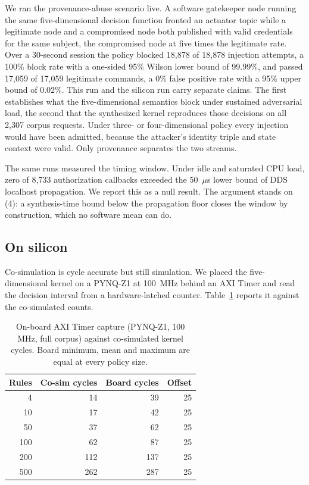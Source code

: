 \documentclass[conference]{IEEEtran}
\newcommand{\new}[1]{\textcolor{hkred}{#1}}
\newcommand{\newcolor}{\color{hkred}}
\begin{document}
We ran the provenance-abuse scenario live. A software gatekeeper node running the same five-dimensional decision function fronted an actuator topic while a legitimate node and a compromised node both published with valid credentials for the same subject, the compromised node at five times the legitimate rate. Over a 30-second session the policy blocked 18{,}878 of 18{,}878 injection attempts, a 100\% block rate with a one-sided 95\% Wilson lower bound of 99.99\%, and passed 17{,}059 of 17{,}059 legitimate commands, a 0\% false positive rate with a 95\% upper bound of 0.02\%. This run and the silicon run carry separate claims. The first establishes what the five-dimensional semantics block under sustained adversarial load, the second that the synthesized kernel reproduces those decisions on all 2{,}307 corpus requests. Under three- or four-dimensional policy every injection would have been admitted, because the attacker's identity triple and state context were valid. Only provenance separates the two streams.

The same runs measured the timing window. Under idle and saturated CPU load, zero of 8{,}733 authorization callbacks exceeded the 50~$\mu$s lower bound of DDS localhost propagation. We report this as a null result. The argument stands on (4): a synthesis-time bound below the propagation floor closes the window by construction, which no software mean can do.

\subsection{\new{On silicon}}
\label{subsec:onsilicon}

\new{Co-simulation is cycle accurate but still simulation. We placed the five-dimensional kernel on a PYNQ-Z1 at 100~MHz behind an AXI Timer and read the decision interval from a hardware-latched counter. Table~\ref{tab:board} reports it against the co-simulated counts.}

\begin{table}[t]
\caption{\new{On-board AXI Timer capture (PYNQ-Z1, 100 MHz, full corpus) against co-simulated kernel cycles. Board minimum, mean and maximum are equal at every policy size.}}
\label{tab:board}
\centering
\newcolor
\begin{tabular}{rrrr}
\toprule
Rules & Co-sim cycles & Board cycles & Offset \\
\midrule
4 & 14 & 39 & 25 \\
10 & 17 & 42 & 25 \\
50 & 37 & 62 & 25 \\
100 & 62 & 87 & 25 \\
200 & 112 & 137 & 25 \\
500 & 262 & 287 & 25 \\
\bottomrule
\end{tabular}
\end{table}
\end{document}
